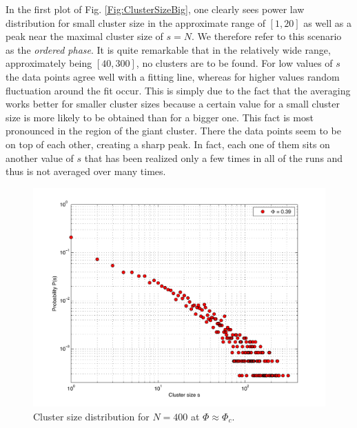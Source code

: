 \documentclass[11pt]{article}
\begin{document}
In the first plot of Fig. \ref{Fig:ClusterSizeBig}, one clearly sees power law distribution for small cluster size in the approximate range of $[1,20]$ as well as a peak near the maximal cluster size of $s=N$. We therefore refer to this scenario as the \textit{ordered phase}. It is quite remarkable that in the relatively wide range, approximately being $[40,300]$, no clusters are to be found. For low values of $s$ the data points agree well with a fitting line, whereas for higher values random fluctuation around the fit occur. This is simply due to the fact that the averaging works better for smaller cluster sizes because a certain value for a small cluster size is more likely to be obtained than for a bigger one. This fact is most pronounced in the region of the giant cluster. There the data points seem to be on top of each other, creating a sharp peak. In fact, each one of them sits on another value of $s$ that has been realized only a few times in all of the runs and thus is not averaged over many times.\\

\begin{figure}[h!]
  \centering
    \includegraphics[scale=0.7]{Plots/S_Line.pdf}
  \caption{Cluster size distribution for $N=400$ at $\Phi \approx \Phi_c$.}
  \label{Fig:ClusterSizeCrit}
\end{figure}
\end{document}
